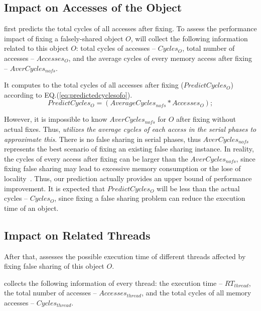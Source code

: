\subsection{Impact on Accesses of the Object}
\label{sec:impactobject}

\cheetah{} first predicts the total cycles of all accesses after fixing. To assess the performance impact of fixing a falsely-shared object $O$, \cheetah{} will collect the following information related to this object $O$:  total cycles of accesses -- $Cycles_O$, total number of accesses -- $Accesses_O$, and the average cycles of every memory access after fixing -- $AverCycles_{nofs}$.

It computes to the total cycles of all accesses after fixing ($PredictCycles_{O}$) according to EQ.(\ref{eq:predictedcyclesofo}).   
\begin{equation}
\label{eq:predictedcyclesofo}
 PredictCycles_{O} = (AverageCycles_{nofs} * Accesses_O);
\end{equation} 

However, it is impossible to know $AverCycles_{nofs}$ for $O$ after fixing without actual fixes. Thus, {\it \cheetah{} utilizes the average cycles of each access in the serial phases to approximate this}. There is no false sharing in serial phases, thus $AverCycles_{nofs}$ represents the best scenario of fixing an existing false sharing instance. In reality, the cycles of every access after fixing can be larger than the $AverCycles_{nofs}$, since fixing false sharing may lead to excessive memory consumption or the lose of locality~\cite{qinzhao}. Thus, our prediction actually provides an upper bound of performance improvement. It is expected that $PredictCycles_{O}$ will be less than the actual cycles -- $Cycles_O$, since fixing a false sharing problem can reduce the execution time of an object.  
 
\subsection{Impact on Related Threads}
\label{sec:impactthread}

After that, \cheetah{} assesses the possible execution time of different threads affected by fixing false sharing of this object $O$. 

\Cheetah{} collects the following information of every thread: the execution time -- $RT_{thread}$, the total number of accesses -- $Accesses_{thread}$, and the total cycles of all memory accesses -- $Cycles_{thread}$.

